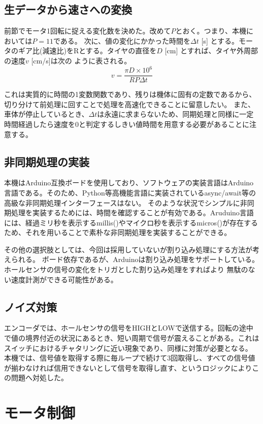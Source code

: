 \documentclass{ltjsreport}
\begin{document}
\subsection{生データから速さへの変換}
前節でモータ1回転に捉える変化数を決めた。改めて$P$とおく。つまり、本機においては$P=11$である。
次に、値の変化にかかった時間を$\Delta t$ [\mu s] とする。モータのギア比(減速比)をRとする。タイヤの直径を$D$ [cm] とすれば、タイヤ外周部の速度$v$ [cm/s]は次の
ように表される。
\[ v = \frac{\pi D \times 10^6}{R P \Delta t} \]

これは実質的に時間の1変数関数であり、残りは機体に固有の定数であるから、切り分けて前処理に回すことで処理を高速化できることに留意したい。
また、車体が停止しているとき、$\Delta t$は永遠に求まらないため、同期処理と同様に一定時間経過したら速度を0と判定するしきい値時間を用意する必要があることに注意する。

\subsection{非同期処理の実装}
本機はArduino互換ボードを使用しており、ソフトウェアの実装言語はArduino言語である。そのため、Python等高機能言語に実装されているasync/await等の高級な非同期処理インターフェースはない。
そのような状況でシンプルに非同期処理を実装するためには、時間を確認することが有効である。Aruduino言語には、経過ミリ秒を表示するmillis()やマイクロ秒を表示するmicros()が存在するため、それを用いることで素朴な非同期処理を実装することができる。

その他の選択肢としては、今回は採用していないが割り込み処理にする方法が考えられる。
ボード依存であるが、Arduinoは割り込み処理をサポートしている。ホールセンサの信号の変化をトリガとした割り込み処理をすればより
無駄のない速度計測ができる可能性がある。
\subsection{ノイズ対策}
エンコーダでは、ホールセンサの信号をHIGHとLOWで送信する。回転の途中で値の境界付近の状況にあるとき、短い周期で信号が震えることがある。これはスイッチにおけるチャタリングに近い現象であり、同様に対策が必要となる。
本機では、信号値を取得する際に毎ループで続けて3回取得し、すべての信号値が揃わなければ信用できないとして信号を取得し直す、というロジックによりこの問題へ対処した。



\section{モータ制御}
\end{document}
